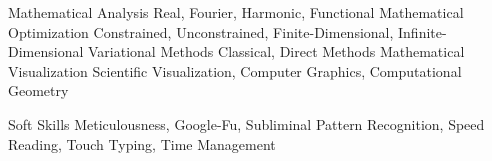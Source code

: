 \begin{cvskills}
  \cvskill
    {Mathematical Analysis} %
    {Real, Fourier, Harmonic, Functional} %
  \cvskill
    {Mathematical Optimization} %
    {Constrained, Unconstrained, Finite-Dimensional, Infinite-Dimensional} %
  \cvskill
    {Variational Methods} %
    {Classical, Direct Methods} %
  \cvskill
    {Mathematical Visualization} %
    {Scientific Visualization, Computer Graphics, Computational Geometry} %

    
  \cvskill
    {Soft Skills} %
    {Meticulousness, Google-Fu, Subliminal Pattern Recognition, Speed Reading, Touch Typing, Time Management} %
\end{cvskills}

